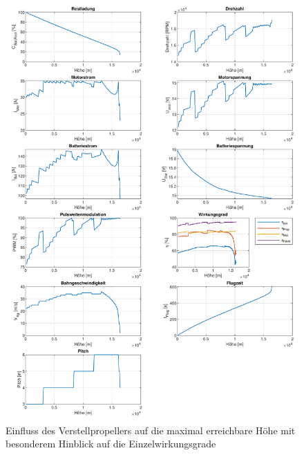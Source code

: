 \begin{appendix}
\begin{figure}[H]
\centering
	\includegraphics[scale=0.7]{Diagramme/Verstellprop_eta.pdf}
	\caption{Einfluss des Verstellpropellers auf die maximal erreichbare Höhe mit besonderem Hinblick auf die Einzelwirkungsgrade}
	\label{abb:verstellprop_eta}
\end{figure}


\end{appendix}
